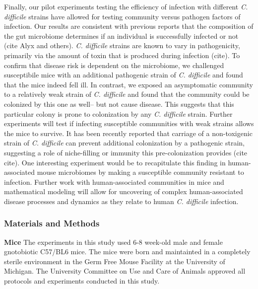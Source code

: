 \documentclass[11pt,]{article}
\begin{document}
Finally, our pilot experiments testing the efficiency of infection with
different \emph{C. difficile} strains have allowed for testing community
versus pathogen factors of infection. Our results are consistent with
previous reports that the composition of the gut microbiome determines
if an individual is successfully infected or not (cite Alyx and others).
\emph{C. difficile} strains are known to vary in pathogenicity,
primarily via the amount of toxin that is produced during infection
(cite). To confirm that disease risk is dependent on the microbiome, we
challenged susceptibile mice with an additional pathogenic strain of
\emph{C. difficile} and found that the mice indeed fell ill. In
contrast, we exposed an asymptomatic community to a relatively weak
strain of \emph{C. difficile} and found that the community could be
colonized by this one as well-- but not cause disease. This suggests
that this particular colony is prone to colonization by any \emph{C.
difficile} strain. Further experiments will test if infecting
susceptible communities with weak strains allows the mice to survive. It
has been recently reported that carriage of a non-toxigenic strain of
\emph{C. difficile} can prevent additional colonization by a pathogenic
strain, suggesting a role of niche-filling or immunity this
pre-colonization provides (cite cite). One interesting experiment would
be to recapitulate this finding in human-associated mouse microbiomes by
making a susceptible community resistant to infection. Further work with
human-associated communities in mice and mathematical modeling will
allow for uncovering of complex human-associated disease processes and
dynamics as they relate to human \emph{C. difficile} infection.

\subsubsection{Materials and Methods}\label{materials-and-methods}

\textbf{Mice} The experiments in this study used 6-8 week-old male and
female gnotobiotic C57/BL6 mice. The mice were born and maintainted in a
completely sterile environment in the Germ Free Mouse Facility at the
University of Michigan. The University Committee on Use and Care of
Animals approved all protocols and experiments conducted in this study.
\end{document}
